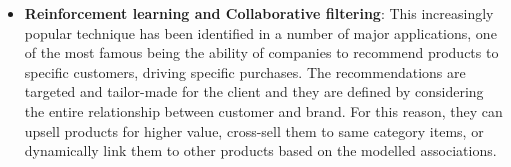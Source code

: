\begin{itemize}
    \item \textbf{Reinforcement learning and Collaborative filtering}: This increasingly popular technique has been identified in a number of major applications, one of the most famous being the ability of companies to recommend products to specific customers, driving specific purchases. The recommendations are targeted and tailor-made for the client and they are defined by considering the entire relationship between customer and brand. For this reason, they can upsell products for higher value, cross-sell them to same category items, or dynamically link them to other products based on the modelled associations.
  \end{itemize} 

